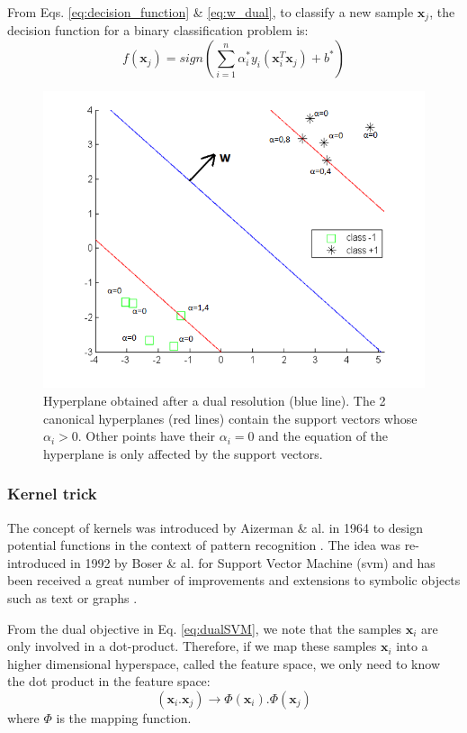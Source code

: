 \noindent From Eqs. \ref{eq:decision_function} \& \ref{eq:w_dual}, to classify a new sample $\textbf{x}_j$, the decision function for a binary classification problem is:
\begin{equation}
	f(\textbf{x}_j) = sign\left( \sum\limits_{i=1}^{n} \alpha_i^*y_i(\textbf{x}_i^T\textbf{x}_j) + b^* \right)  \label{decisionDual}
\end{equation} 

\begin{figure}[h!]
	\centering
	\includegraphics[width=0.6\linewidth]{images/SVM_SV2}
	\caption[Hyperplane obtained after a dual resolution (blue line). ]{Hyperplane obtained after a dual resolution (blue line). The 2 canonical hyperplanes (red lines) contain the support vectors whose $\alpha_i > 0$. Other points have their $\alpha_i = 0$ and the equation of the hyperplane is only affected by the support vectors.}
	\label{fig:SVM_SV}
\end{figure}


\subsubsection{Kernel trick}
The concept of kernels was introduced by Aizerman \& al. in 1964 to design potential functions in the context of pattern recognition \cite{Aizerman1964}. The idea was re-introduced in 1992 by Boser \& al. for Support Vector Machine ({\sc svm}) and has been received a great number of improvements and extensions to symbolic objects such as text or graphs \cite{Boser1992}.

From the dual objective in Eq. \ref{eq:dualSVM}, we note that the samples $\textbf{x}_i$ are only involved in a dot-product. Therefore, if we map these samples $\textbf{x}_i$ into a higher dimensional hyperspace, called the feature space, we only need to know the dot product in the feature space:
\begin{equation}
	(\textbf{x}_i . \textbf{x}_j) \rightarrow \Phi(\textbf{x}_i) . \Phi(\textbf{x}_j) 
\end{equation}
\noindent where $\Phi$ is the mapping function. \\

